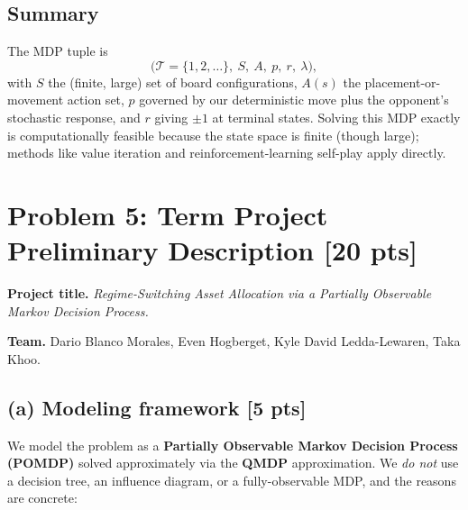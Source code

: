 \documentclass[12pt]{article}
\begin{document}
\subsection*{Summary}

The MDP tuple is
\[
  \big(\mathcal{T} = \{1,2,\ldots\},\ S,\ A,\ p,\ r,\ \lambda\big),
\]
with $S$ the (finite, large) set of board configurations, $A(s)$ the placement-or-movement action set, $p$ governed by our deterministic move plus the opponent's stochastic response, and $r$ giving $\pm 1$ at terminal states. Solving this MDP exactly is computationally feasible because the state space is finite (though large); methods like value iteration and reinforcement-learning self-play apply directly.

\section*{Problem 5: Term Project Preliminary Description \hfill [20 pts]}

\textbf{Project title.} \emph{Regime-Switching Asset Allocation via a Partially Observable Markov Decision Process.}

\textbf{Team.} Dario Blanco Morales, Even Hogberget, Kyle David Ledda-Lewaren, Taka Khoo.

\subsection*{(a) Modeling framework \hfill [5 pts]}

We model the problem as a \textbf{Partially Observable Markov Decision Process (POMDP)} solved approximately via the \textbf{QMDP} approximation. We \emph{do not} use a decision tree, an influence diagram, or a fully-observable MDP, and the reasons are concrete:
\end{document}
